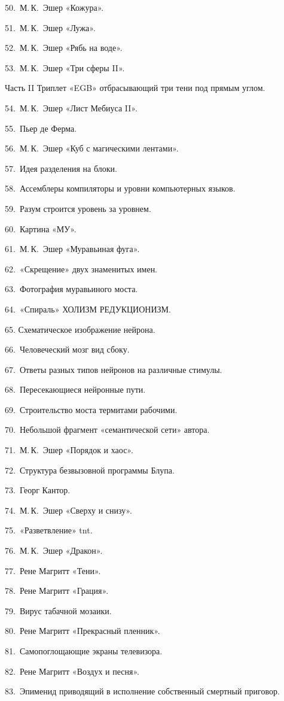 \documentclass[../main.tex]{subfiles}
\begin{document}
50.~М.\,К.~Эшер «Кожура».

51.~М.\,К.~Эшер «Лужа».

52.~М.\,К.~Эшер «Рябь на воде».

53.~М.\,К.~Эшер «Три сферы II».

Часть II Триплет «EGB» отбрасывающий три тени под прямым углом.

54.~М.\,К.~Эшер «Лист Мебиуса II».

55.~Пьер де Ферма.

56.~М.\,К.~Эшер «Куб с магическими лентами».

57.~Идея разделения на блоки.

58.~Ассемблеры компиляторы и уровни компьютерных языков.

59.~Разум строится уровень за уровнем.

60.~Картина «МУ».

61.~М.\,К.~Эшер «Муравьиная фуга».

62.~«Скрещение» двух знаменитых имен.

63.~Фотография муравьиного моста.

64.~«Спираль» ХОЛИЗМ РЕДУКЦИОНИЗМ.

65. Схематическое изображение нейрона.

66.~Человеческий мозг вид сбоку.

67.~Ответы разных типов нейронов на различные стимулы.

68.~Пересекающиеся нейронные пути.

69.~Строительство моста термитами рабочими.

70.~Небольшой фрагмент «семантической сети» автора.

71.~М.\,К.~Эшер «Порядок и хаос».

72.~Структура безвызовной программы Блупа.

73.~Георг Кантор.

74.~М.\,К.~Эшер «Сверху и снизу».

75.~«Разветвление» \acs{tnt}.

76.~М.\,К.~Эшер «Дракон».

77.~Рене Магритт «Тени».

78.~Рене Магритт «Грация».

79.~Вирус табачной мозаики.

80.~Рене Магритт «Прекрасный пленник».

81.~Самопоглощающие экраны телевизора.

82.~Рене Магритт «Воздух и песня».

83.~Эпименид приводящий в исполнение собственный смертный приговор.
\end{document}
